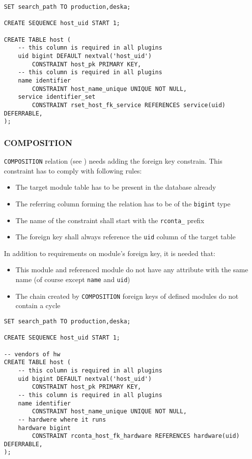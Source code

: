 \documentclass[deska]{subfiles}
\begin{document}
\begin{verbatim}
SET search_path TO production,deska;

CREATE SEQUENCE host_uid START 1;

CREATE TABLE host (
    -- this column is required in all plugins
    uid bigint DEFAULT nextval('host_uid')
        CONSTRAINT host_pk PRIMARY KEY,
    -- this column is required in all plugins
    name identifier
        CONSTRAINT host_name_unique UNIQUE NOT NULL,
    service identifier_set
        CONSTRAINT rset_host_fk_service REFERENCES service(uid) DEFERRABLE,
);
\end{verbatim}

\subsubsection{COMPOSITION}
{\tt COMPOSITION} relation (see ) needs adding the foreign key constrain. This constraint has to comply with following rules:
\begin{itemize}
    \item The target module table has to be present in the database already
    \item The referring column forming the relation has to be of the {\tt bigint} type
    \item The name of the constraint shall start with the {\tt rconta\_} prefix
    \item The foreign key shall always reference the {\tt uid} column of the target table
\end{itemize}
In addition to requirements on module's foreign key, it is needed that:
\begin{itemize}
    \item This module and referenced module do not have any attribute with the same name (of course except {\tt name} and {\tt uid})
    \item The chain created by {\tt COMPOSITION} foreign keys of defined modules do not contain a cycle
\end{itemize}

\begin{verbatim}
SET search_path TO production,deska;

CREATE SEQUENCE host_uid START 1;

-- vendors of hw
CREATE TABLE host (
    -- this column is required in all plugins
    uid bigint DEFAULT nextval('host_uid')
        CONSTRAINT host_pk PRIMARY KEY,
    -- this column is required in all plugins
    name identifier
        CONSTRAINT host_name_unique UNIQUE NOT NULL,
    -- hardwere where it runs
    hardware bigint
        CONSTRAINT rconta_host_fk_hardware REFERENCES hardware(uid) DEFERRABLE,
);
\end{verbatim}
\end{document}
